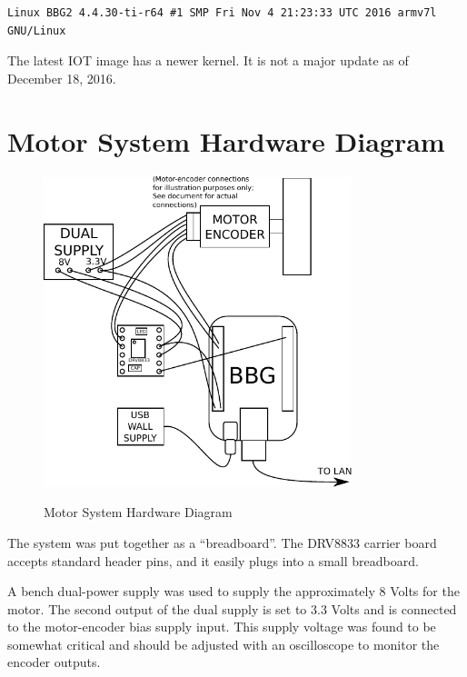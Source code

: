 \begin{verbatim}
Linux BBG2 4.4.30-ti-r64 #1 SMP Fri Nov 4 21:23:33 UTC 2016 armv7l GNU/Linux
\end{verbatim}

The latest IOT image has a newer kernel.  It is not a major update as of December 18, 2016.

\section{Motor System Hardware Diagram}

\begin{figure}[H]
	\centering
	\includegraphics[width=0.8\textwidth]{diagrams/motor_system}
	\centering\bfseries
	\caption{Motor System Hardware Diagram}
\end{figure}

The system was put together as a ``breadboard''.  The DRV8833 carrier board accepts standard header pins, and it easily plugs into a small breadboard.

A bench dual-power supply was used to supply the approximately 8 Volts for the motor.  The second output of the dual supply is set to 3.3 Volts and is connected to the motor-encoder bias supply input.  This supply voltage was found to be somewhat critical and should be adjusted with an oscilloscope to monitor the encoder outputs.

